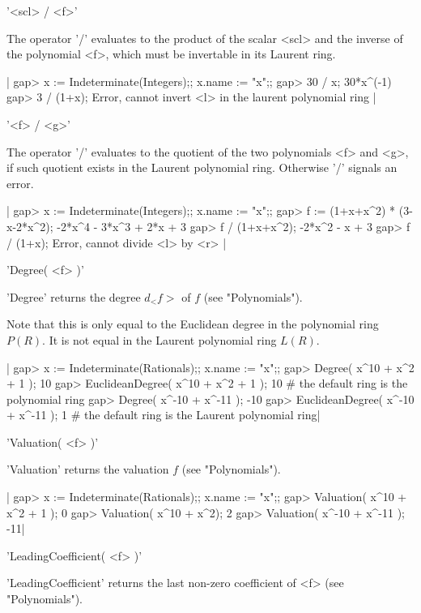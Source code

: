 '<scl> / <f>'

The  operator '/' evaluates to  the  product of the scalar <scl>  and the
inverse of the  polynomial <f>, which  must  be invertable in its Laurent
ring.

|    gap> x := Indeterminate(Integers);; x.name := "x";;
    gap> 30 / x;
    30*x^(-1)
    gap> 3 / (1+x);
    Error, cannot invert <l> in the laurent polynomial ring |

'<f> / <g>'

The operator '/' evaluates to the quotient of the two polynomials <f> and
<g>, if such quotient exists  in the  Laurent polynomial ring.  Otherwise
'/' signals an error.

|    gap> x := Indeterminate(Integers);; x.name := "x";;
    gap> f := (1+x+x^2) * (3-x-2*x^2);
    -2*x^4 - 3*x^3 + 2*x + 3
    gap> f / (1+x+x^2);
    -2*x^2 - x + 3
    gap> f / (1+x);
    Error, cannot divide <l> by <r> |


'Degree( <f> )'

'Degree' returns the degree $d_<f>$ of $f$ (see "Polynomials").

Note that  this  is only equal to  the Euclidean degree in the polynomial
ring $P(R)$. It is not equal in the Laurent polynomial ring $L(R)$.

|    gap> x := Indeterminate(Rationals);; x.name := "x";;
    gap> Degree( x^10 + x^2 + 1 );
    10
    gap> EuclideanDegree( x^10 + x^2 + 1 );
    10      # the default ring is the polynomial ring
    gap> Degree( x^-10 + x^-11 );
    -10
    gap> EuclideanDegree( x^-10 + x^-11 );
    1       # the default ring is the Laurent polynomial ring|


'Valuation( <f> )'

'Valuation' returns the valuation $f$ (see "Polynomials").

|    gap> x := Indeterminate(Rationals);; x.name := "x";;
    gap> Valuation( x^10 + x^2 + 1 );
    0
    gap> Valuation( x^10 + x^2);
    2
    gap> Valuation( x^-10 + x^-11 );
    -11|


'LeadingCoefficient( <f> )'

'LeadingCoefficient' returns the  last non-zero  coefficient  of <f> (see
"Polynomials").

